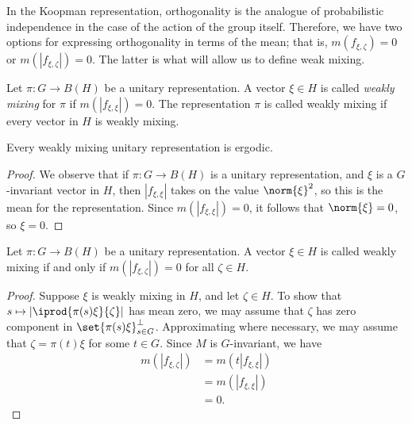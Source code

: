 \documentclass[10pt]{mypackage}
\begin{document}
In the Koopman representation, orthogonality is the analogue of probabilistic independence in the case of the action of the group itself. Therefore, we have two options for expressing orthogonality in terms of the mean; that is, $m\left( f_{\xi,\zeta} \right) = 0$ or $m\left( \left\vert f_{\xi,\zeta} \right\vert \right) = 0$. The latter is what will allow us to define weak mixing.
\begin{definition}
  Let $\pi\colon G\rightarrow B\left( H \right)$ be a unitary representation. A vector $\xi\in H$ is called \textit{weakly mixing} for $\pi$ if $m\left( \left\vert f_{\xi,\xi} \right\vert \right) = 0$. The representation $\pi$ is called weakly mixing if every vector in $H$ is weakly mixing.
\end{definition}
\begin{proposition}
  Every weakly mixing unitary representation is ergodic.
\end{proposition}
\begin{proof}
  We observe that if $\pi\colon G\rightarrow B\left( H \right)$ is a unitary representation, and $\xi$ is a $G$-invariant vector in $H$, then $\left\vert f_{\xi,\xi} \right\vert$ takes on the value $\norm{\xi}^2$, so this is the mean for the representation. Since $m\left( \left\vert f_{\xi,\xi} \right\vert \right) = 0$, it follows that $\norm{\xi} = 0$, so $\xi = 0$.
\end{proof}
\begin{lemma}
  Let $\pi\colon G\rightarrow B\left( H \right)$ be a unitary representation. A vector $\xi\in H$ is called weakly mixing if and only if $m\left( \left\vert f_{\xi,\zeta} \right\vert \right) = 0$ for all $\zeta\in H$.
\end{lemma}
\begin{proof}
  Suppose $\xi$ is weakly mixing in $H$, and let $\zeta\in H$. To show that $s\mapsto \left\vert \iprod{\pi(s)\xi}{\zeta} \right\vert$ has mean zero, we may assume that $\zeta$ has zero component in $\set{\pi(s)\xi}_{s\in G}^{\perp}$. Approximating where necessary, we may assume that $\zeta = \pi(t)\xi$ for some $t\in G$. Since $M$ is $G$-invariant, we have
  \begin{align*}
    m\left( \left\vert f_{\xi,\zeta} \right\vert \right) &= m\left( t\left\vert f_{\xi,\xi} \right\vert \right)\\
                                                         &= m\left( \left\vert f_{\xi,\xi} \right\vert \right)\\
                                                         &= 0.
  \end{align*}
\end{proof}
\end{document}
